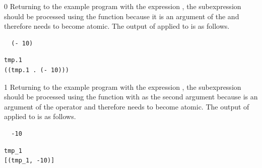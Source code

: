 \documentclass[7x10]{TimesAPriori_MIT}%
\def\racketEd{0}
\def\pythonEd{1}
\def\edition{1}
\begin{document}
{\if\edition\racketEd
Returning to the example program with the expression , the subexpression  should be processed using the
 function because it is an argument of the \code{+} and
therefore needs to become atomic.  The output of 
applied to  is as follows.
\begin{transformation}
\begin{lstlisting}
  (- 10)
\end{lstlisting}
\compilesto
\begin{lstlisting}
tmp.1
((tmp.1 . (- 10)))
\end{lstlisting}
\end{transformation}
\fi}
%
{\if\edition\pythonEd
%
Returning to the example program with the expression ,
the subexpression  should be processed using the
 function with  as the second argument
because  is an argument of the \code{+} operator and
therefore needs to become atomic.  The output of 
applied to  is as follows.
\begin{transformation}
\begin{lstlisting}
  -10
\end{lstlisting}
\compilesto
\begin{lstlisting}
tmp_1
[(tmp_1, -10)]
\end{lstlisting}
\end{transformation}
%  
\fi}
\end{document}
